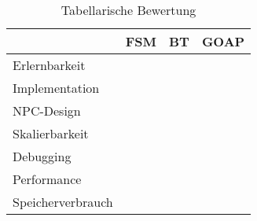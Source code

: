 \begin{table}[h]
  \caption{Tabellarische Bewertung}
  \label{tab:es vergleich tabelle}
  \centering
  \begin{tabular}{lccc}
    \toprule
    & FSM & BT & GOAP\\
    \midrule
		Erlernbarkeit & \harveyBallFull & \harveyBallThreeQuarter & \harveyBallHalf\\
    Implementation	& \harveyBallFull  & \harveyBallThreeQuarter  & \harveyBallHalf\\
		NPC-Design & \harveyBallQuarter & \harveyBallThreeQuarter & \harveyBallFull\\
    Skalierbarkeit	& \harveyBallQuarter & \harveyBallHalf & \harveyBallFull\\
    Debugging	& \harveyBallHalf & \harveyBallThreeQuarter & \harveyBallQuarter\\
		Performance & \harveyBallFull & \harveyBallThreeQuarter & \harveyBallHalf\\
		Speicherverbrauch & \harveyBallFull & \harveyBallFull & \harveyBallThreeQuarter\\
    \bottomrule
  \end{tabular}
\end{table}